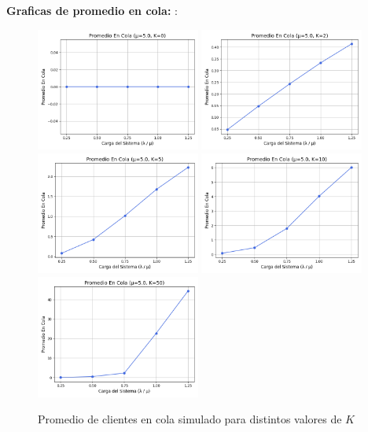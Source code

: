 \documentclass[12pt]{article}
\begin{document}
\textbf{Graficas de promedio en cola: }:
\begin{figure}[H]
    \centering
    \includegraphics[width=0.48\textwidth]{graficas/mm1k/k_0/promedio_en_cola.png}
    \includegraphics[width=0.48\textwidth]{graficas/mm1k/k_2/promedio_en_cola.png}
    \includegraphics[width=0.48\textwidth]{graficas/mm1k/k_5/promedio_en_cola.png}
    \includegraphics[width=0.48\textwidth]{graficas/mm1k/k_10/promedio_en_cola.png}
    \includegraphics[width=0.48\textwidth]{graficas/mm1k/k_50/promedio_en_cola.png}
    \caption{Promedio de clientes en cola simulado para distintos valores de \( K \)}
\end{figure}
\end{document}
